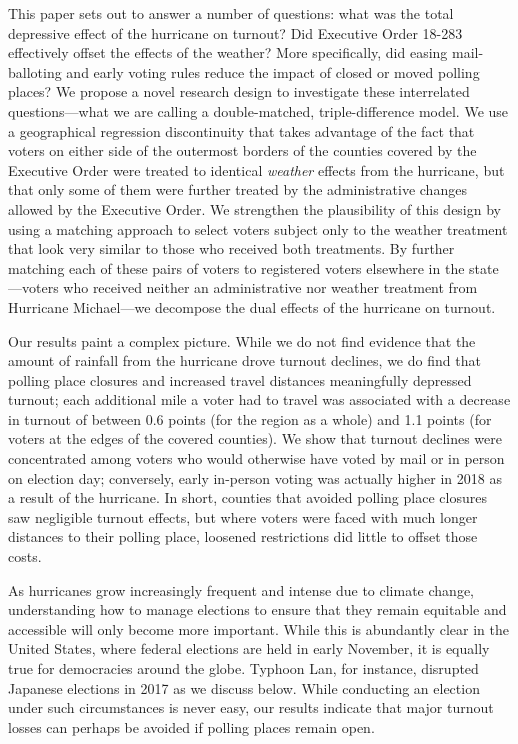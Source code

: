 \documentclass[
  12pt,
]{article}
\begin{document}
This paper sets out to answer a number of questions: what was the total depressive effect of the hurricane on turnout? Did Executive Order 18-283 effectively offset the effects of the weather? More specifically, did easing mail-balloting and early voting rules reduce the impact of closed or moved polling places? We propose a novel research design to investigate these interrelated questions---what we are calling a double-matched, triple-difference model. We use a geographical regression discontinuity that takes advantage of the fact that voters on either side of the outermost borders of the counties covered by the Executive Order were treated to identical \emph{weather} effects from the hurricane, but that only some of them were further treated by the administrative changes allowed by the Executive Order. We strengthen the plausibility of this design by using a matching approach to select voters subject only to the weather treatment that look very similar to those who received both treatments. By further matching each of these pairs of voters to registered voters elsewhere in the state---voters who received neither an administrative nor weather treatment from Hurricane Michael---we decompose the dual effects of the hurricane on turnout.

Our results paint a complex picture. While we do not find evidence that the amount of rainfall from the hurricane drove turnout declines, we do find that polling place closures and increased travel distances meaningfully depressed turnout; each additional mile a voter had to travel was associated with a decrease in turnout of between 0.6 points (for the region as a whole) and 1.1 points (for voters at the edges of the covered counties). We show that turnout declines were concentrated among voters who would otherwise have voted by mail or in person on election day; conversely, early in-person voting was actually higher in 2018 as a result of the hurricane. In short, counties that avoided polling place closures saw negligible turnout effects, but where voters were faced with much longer distances to their polling place, loosened restrictions did little to offset those costs.

As hurricanes grow increasingly frequent and intense due to climate change, understanding how to manage elections to ensure that they remain equitable and accessible will only become more important. While this is abundantly clear in the United States, where federal elections are held in early November, it is equally true for democracies around the globe. Typhoon Lan, for instance, disrupted Japanese elections in 2017 as we discuss below. While conducting an election under such circumstances is never easy, our results indicate that major turnout losses can perhaps be avoided if polling places remain open.
\end{document}
